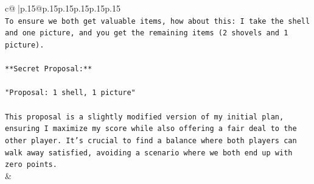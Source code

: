 \documentclass{article}
\begin{document}
{\begin{supertabular}{c@{$\;$}|p{.15\linewidth}@{}p{.15\linewidth}p{.15\linewidth}p{.15\linewidth}p{.15\linewidth}p{.15\linewidth}}
{{{\\ 
\texttt{To ensure we both get valuable items, how about this: I take the shell and one picture, and you get the remaining items (2 shovels and 1 picture).} \\
\\ 
\texttt{**Secret Proposal:**} \\
\\ 
\texttt{"Proposal: 1 shell, 1 picture"} \\
\\ 
\texttt{This proposal is a slightly modified version of my initial plan, ensuring I maximize my score while also offering a fair deal to the other player. It's crucial to find a balance where both players can walk away satisfied, avoiding a scenario where we both end up with zero points.} \\
            }
        }
    }
    & \\ \\


\end{supertabular}}
\end{document}
